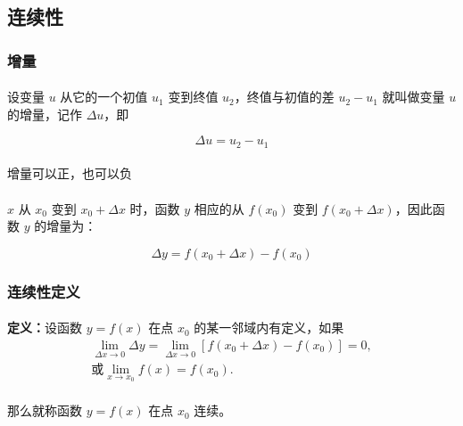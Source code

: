 \subsection{连续性}
\subsubsection{增量}
\paragraph{}
设变量 $u$ 从它的一个初值 $u_1$ 变到终值 $u_2$，终值与初值的差 $u_2 - u_1$ 就叫做变量 $u$ 的增量，记作 $\Delta u$，即

\begin{equation}
\Delta u = u_2 - u_1
\end{equation}

\paragraph{}
增量可以正，也可以负

\paragraph{}
$x$ 从 $x_0$ 变到 $x_0 + \Delta x$ 时，函数 $y$ 相应的从 $f(x_0)$ 变到 $f(x_0 + \Delta x)$，因此函数 $y$ 的增量为：

\begin{equation}
\Delta y = f(x_0 + \Delta x) - f(x_0)
\end{equation}

\subsubsection{连续性定义}
\paragraph{}
\textbf{定义：}设函数 $y = f(x)$ 在点 $x_0$ 的某一邻域内有定义，如果
\begin{gather}
\lim_{\Delta x \to 0}\Delta y = \lim_{\Delta x \to 0}[f(x_0 + \Delta x) - f(x_0)] = 0, \\
\text{或} \lim_{x \to x_0} f(x) = f(x_0).
\end{gather}

\paragraph{}
那么就称函数 $y = f(x)$ 在点 $x_0$ 连续。

